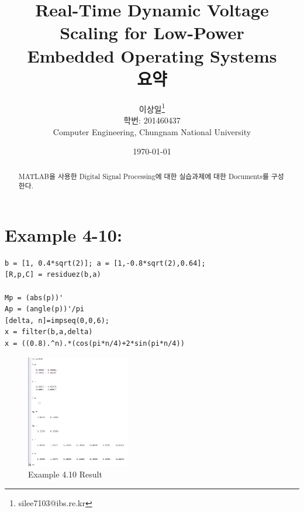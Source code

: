 \documentclass[11pt
  , a4paper
  , article
  , oneside
]{memoir}
\begin{document}
\newcommand{\technumber}{
  저전력 실시간 시스템\\
  Document 1: 2016-06-02}
\title{\textbf{Real-Time Dynamic Voltage Scaling for Low-Power \\
		Embedded Operating Systems \\
		요약 \\}}

\author{이상일\thanks{silee7103@ibs.re.kr} \\

  학번: 201460437\\
  Computer Engineering, Chungnam National University 
}
\date{\today}

\renewcommand{\maketitlehooka}{\begin{flushright}\textsf{\technumber}\end{flushright}}

\maketitle

\begin{abstract}
MATLAB을 사용한 Digital Signal Processing에 대한 실습과제에 대한 Documents를 구성한다.
\end{abstract}

\chapter{Example 4-10:}

\begin{lstlisting}[style=termstyle]
%Example 4-10
b = [1, 0.4*sqrt(2)]; a = [1,-0.8*sqrt(2),0.64];
[R,p,C] = residuez(b,a)

Mp = (abs(p))'
Ap = (angle(p))'/pi
[delta, n]=impseq(0,0,6);
x = filter(b,a,delta)
x = ((0.8).^n).*(cos(pi*n/4)+2*sin(pi*n/4))\end{lstlisting}

\begin{figure}[h!]
	\centering
	\includegraphics[width=0.4\textwidth,height=0.15\textwidth]{./images/ex410.png}
	\caption{Example 4.10 Result}
	\label{fig:Example 4.10 Result}
\end{figure}
\end{document}
